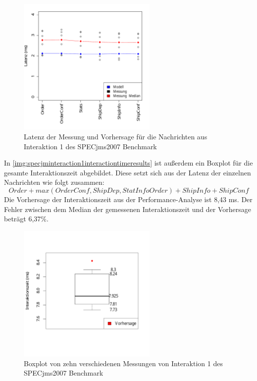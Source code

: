 \begin{figure}
\center
  \includegraphics[width=0.6\textwidth]{images/evaluation/specjmsresults/interaktion1.pdf}
  \caption{Latenz der Messung und Vorhersage für die Nachrichten aus Interaktion 1 des SPECjms2007 Benchmark}
  \label{img:specjminteraction1results}
\end{figure}

In \autoref{img:specjminteraction1interactiontimeresults} ist außerdem ein Boxplot für die gesamte Interaktionszeit abgebildet. Diese setzt sich aus der Latenz der einzelnen Nachrichten wie folgt zusammen: \[\mathit{Order} + max(\mathit{OrderConf}, \mathit{ShipDep}, \mathit{StatInfoOrder}) + \mathit{ShipInfo} + \mathit{ShipConf}\] 
Die Vorhersage der Interaktionszeit aus der Performance-Analyse ist 8,43 ms. Der Fehler zwischen dem Median der gemessenen Interaktionszeit und der Vorhersage beträgt 6,37\%.

\begin{figure}
\center
  \includegraphics[width=0.6\textwidth]{images/evaluation/specjmsresults/interaktion1InteractionTime.pdf}
  \caption{Boxplot von zehn verschiedenen Messungen von Interaktion 1 des SPECjms2007 Benchmark}
  \label{img:specjminteraction1interactiontimeresults}
\end{figure}


